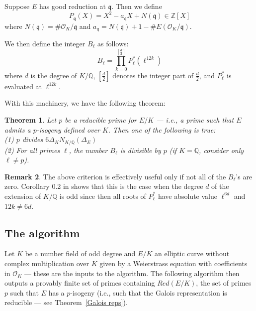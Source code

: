 \documentclass{amsart}
\newtheorem{theorem}{Theorem}[subsection]
\theoremstyle{definition}
\newtheorem{remark} [theorem] {Remark}
\newcommand{\Q}{\mathbb{Q}}
\newcommand{\OK}{\mathcal{O}_K}
\newcommand{\Z}{\mathbb{Z}}
\newcommand{\q}{\mathfrak{q}}
\begin{document}
Suppose $E$ has good reduction at $\q$. Then we define \label{not:minimal Frob}
\begin{equation}
P_\q(X) = X^2 - a_\q X + N(\q) \in \Z[X] \nonumber
\end{equation}
where $N(\q) = \#\OK/\q$ and $a_\q = N(\q) + 1 - \#E(\OK/\q)$.

We then define the integer $B_\ell$ as follows: \label{not:Bl}
\begin{equation}
B_\ell = \prod_{k=0}^{[\frac{d}{2}]} P_\ell^*(\ell^{12k}) \nonumber
\end{equation}
where $d$ is the degree of $K/\Q$, $[\frac{d}{2}]$ denotes the integer part of $\frac{d}{2}$, and $P_\ell^*$ is evaluated at $\ell^{12k}$.

With this machinery, we have the following theorem:

\begin{theorem}
Let $p$ be a reducible prime for $E/K$ --- i.e., a prime such that $E$ admits a $p$-isogeny defined over $K$. Then one of the following is true:
\\ \emph{(1)} $p$ divides $6 \Delta_K N_{K/\Q}(\Delta_E)$
\\ \emph{(2)} For all primes $\ell$, the number $B_\ell$ is divisible by $p$ (if $K = \Q$, consider only $\ell \neq p$).
\end{theorem}

\begin{remark}
The above criterion is effectively useful only if not all of the $B_\ell$'s are zero. Corollary 0.2 in \cite{billerey:isogenies} shows that this is the case when the degree $d$ of the extension of $K/\Q$ is odd since then all roots of $P_\ell^*$ have absolute value $\ell^{6d}$ and $12k \neq 6d$.
\end{remark}



\subsection{The algorithm} \label{sec:isogenies2}

Let $K$ be a number field of odd degree and $E/K$ an elliptic curve without complex multiplication over $K$ given by a Weierstrass equation with coefficients in $\OK$ --- these are the inputs to the algorithm. The following algorithm then outputs a provably finite set of primes containing $Red(E/K)$, the set of primes $p$ such that $E$ has a $p$-isogeny (i.e., such that the Galois representation is reducible --- see Theorem~\ref{Galois reps}).
\end{document}

